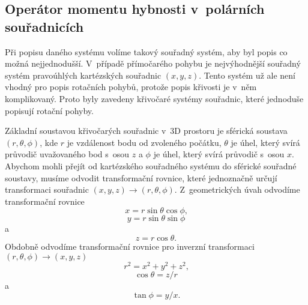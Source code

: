 \subsection{Operátor momentu hybnosti v~polárních souřadnicích}
\label{kap:PolarniSouradnice}

Při popisu daného systému volíme takový souřadný systém, aby byl popis co možná nejjednodušší. V~případě přímočarého pohybu je nejvýhodnější souřadný systém pravoúhlých kartézských souřadnic $(x,y,z)$. Tento systém už ale není vhodný pro popis rotačních pohybů, protože popis křivosti je v~něm komplikovaný. Proto byly zavedeny křivočaré systémy souřadnic, které jednoduše popisují rotační pohyby.

Základní soustavou křivočarých souřadnic v~3D prostoru je sférická soustava $(r,\theta,\phi)$, kde $r$ je vzdálenost bodu od zvoleného počátku, $\theta$ je úhel, který svírá průvodič uvažovaného bod s~osou $z$ a $\phi$ je úhel, který svírá průvodič s~osou $x$. Abychom mohli přejít od kartézského souřadného systému do sférické souřadné soustavy, musíme odvodit transformační rovnice, které jednoznačně určují transformaci souřadnic $(x,y,z) \rightarrow (r,\theta,\phi)$. Z~geometrických úvah odvodíme transformační rovnice
\begin{equation}
x= r \sin \theta \cos \phi \mbox{,}
\label{rov:Hybnost39}
\end{equation}
\begin{equation}
y= r \sin \theta \sin \phi
\label{rov:Hybnost40}
\end{equation}
a
\begin{equation}
z = r \cos \theta \mbox{.}
\label{rov:Hybnost41}
\end{equation}
Obdobně odvodíme transformační rovnice pro inverzní transformaci $(r,\theta,\phi) \rightarrow (x,y,z)$
\begin{equation}
r^2=x^2+y^2+z^2 \mbox{,}
\label{rov:Hybnost42}
\end{equation}
\begin{equation}
\cos \theta = z/r
\label{rov:Hybnost43}
\end{equation}
a
\begin{equation}
\tan \phi = y/x \mbox{.}
\label{rov:Hybnost44}
\end{equation}

